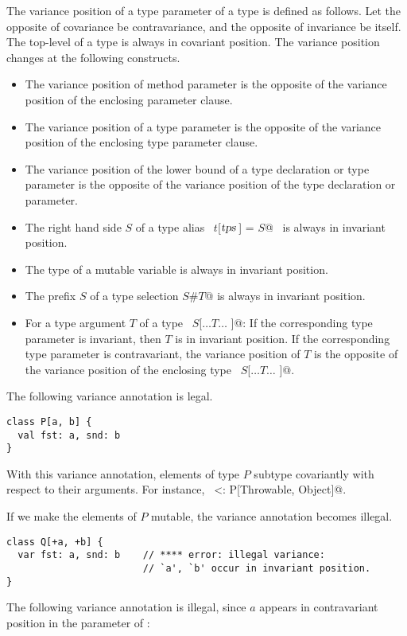 \documentclass[a4paper,12pt,twoside,titlepage]{book}
\newcommand{\tps}{\mbox{\sl tps}}
\begin{document}
The variance position of a type parameter of a type is defined as
follows.  Let the opposite of covariance be contravariance, and the
opposite of invariance be itself.  The top-level of a type is always
in covariant position. The variance position changes at the following
constructs.
\begin{itemize}
\item
The variance position of method parameter is the opposite of the 
variance position of the enclosing parameter clause.
\item
The variance position of a type parameter is the opposite of the
variance position of the enclosing type parameter clause.
\item
The variance position of the lower bound of a type declaration or type parameter 
is the opposite of the variance position of the type declaration or parameter.  
\item
The right hand side $S$ of a type alias ~\lstinline@type $t$[$\tps\,$] = $S$@~ 
is always in invariant position.
\item
The type of a mutable variable is always in invariant position.
\item 
The prefix $S$ of a type selection \lstinline@$S$#$T$@ is always in invariant position.
\item
For a type argument $T$ of a type ~\lstinline@$S$[$\ldots T \ldots$ ]@: If the
corresponding type parameter is invariant, then $T$ is in
invariant position.  If the corresponding type parameter is
contravariant, the variance position of $T$ is the opposite of
the variance position of the enclosing type ~\lstinline@$S$[$\ldots T \ldots$ ]@.
\end{itemize}

\example The following variance annotation is legal. 
\begin{lstlisting}
class P[a, b] {
  val fst: a, snd: b
}\end{lstlisting}
With this variance annotation, elements
of type $P$ subtype covariantly with respect to their arguments. 
For instance, ~ <: P[Throwable, Object]@.

If we make the elements of $P$ mutable, 
the variance annotation becomes illegal. 
\begin{lstlisting}
class Q[+a, +b] { 
  var fst: a, snd: b    // **** error: illegal variance:
                        // `a', `b' occur in invariant position.
}
\end{lstlisting}

\example The following variance annotation is illegal, since $a$ appears
in contravariant position in the parameter of :
\end{document}
